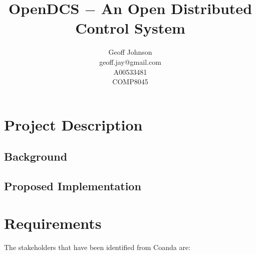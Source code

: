 \documentclass[11pt]{article}
\begin{document}
\nocite{*}

  \title{%
    OpenDCS $-$ An Open Distributed Control System\vspace{2em}
  }

  \author{%
    Geoff Johnson \vspace{0.5em} \\
    geoff.jay@gmail.com \vspace{0.5em} \\
    A00533481 \vspace{0.5em} \\
    COMP8045 \vspace{0.5em}
  }

  \maketitle
  \thispagestyle{empty}
  \newpage
  \mbox{}
  \thispagestyle{empty}

  \newpage
  \addtocounter{page}{-1}
  \tableofcontents
  \listoffigures
  \listoftables
  \lstlistoflistings

  \newpage


  \section{Project Description}\label{sec:desc}

    \subsection{Background}\label{sec:desc-bg}

    \subsection{Proposed Implementation}\label{sec:desc-impl}

  \section{Requirements}\label{sec:req}

    The stakeholders that have been identified from Coanda are:
\end{document}
